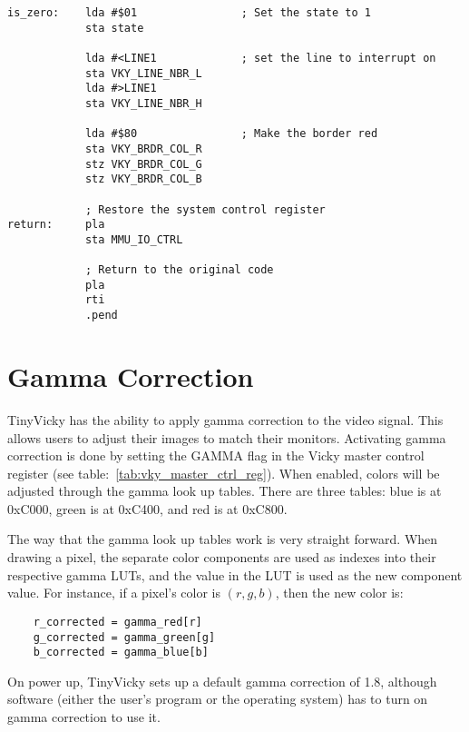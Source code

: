 \begin{verbatim}
is_zero:    lda #$01                ; Set the state to 1
            sta state

            lda #<LINE1             ; set the line to interrupt on
            sta VKY_LINE_NBR_L
            lda #>LINE1
            sta VKY_LINE_NBR_H

            lda #$80                ; Make the border red
            sta VKY_BRDR_COL_R
            stz VKY_BRDR_COL_G
            stz VKY_BRDR_COL_B

            ; Restore the system control register
return:     pla
            sta MMU_IO_CTRL

            ; Return to the original code
            pla
            rti
            .pend
\end{verbatim}

\section*{Gamma Correction}
\label{sec:gamma}

TinyVicky has the ability to apply gamma correction to the video signal. This allows users to adjust their images to match their monitors. Activating gamma correction is done by setting the GAMMA flag in the Vicky master control register (see table:~\ref{tab:vky_master_ctrl_reg}). When enabled, colors will be adjusted through the gamma look up tables. There are three tables: blue is at 0xC000, green is at 0xC400, and red is at 0xC800.

The way that the gamma look up tables work is very straight forward. When drawing a pixel, the separate color components are used as indexes into their respective gamma LUTs, and the value in the LUT is used as the new component value. For instance, if a pixel's color is $(r, g, b)$, then the new color is:
\begin{verbatim}
    r_corrected = gamma_red[r]
    g_corrected = gamma_green[g]
    b_corrected = gamma_blue[b]
\end{verbatim}

On power up, TinyVicky sets up a default gamma correction of 1.8, although software (either the user's program or the operating system) has to turn on gamma correction to use it.
